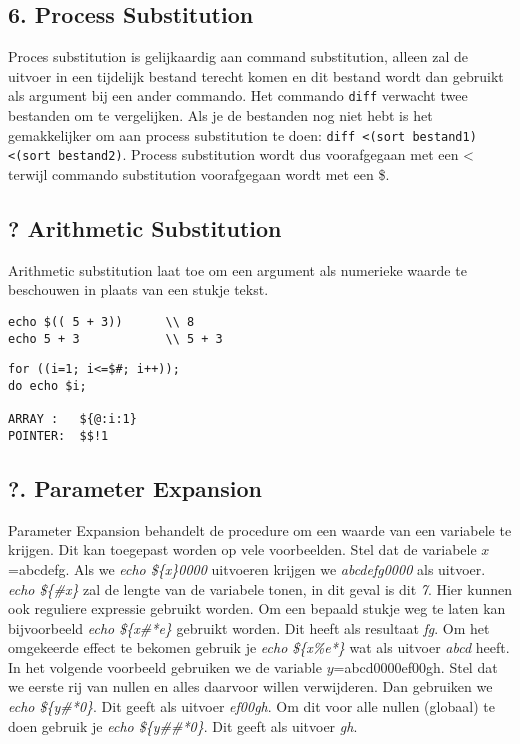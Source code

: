 \documentclass{report}
\begin{document}
\subsection{6. Process Substitution}
Proces substitution is gelijkaardig aan command substitution, alleen zal de uitvoer in een tijdelijk bestand terecht komen en dit bestand wordt dan gebruikt als argument bij een ander commando. Het commando \texttt{diff} verwacht twee bestanden om te vergelijken. Als je de bestanden nog niet hebt is het gemakkelijker om aan process substitution te doen: \texttt{diff <(sort bestand1) <(sort bestand2)}. Process substitution wordt dus voorafgegaan met een < terwijl commando substitution voorafgegaan wordt met een \$.
\subsection{? Arithmetic Substitution}
Arithmetic substitution laat toe om een argument als numerieke waarde te beschouwen in plaats van een stukje tekst. 
\begin{lstlisting}
echo $(( 5 + 3))      \\ 8
echo 5 + 3            \\ 5 + 3
\end{lstlisting}

\begin{lstlisting}
for ((i=1; i<=$#; i++)); 
do echo $i;

ARRAY :   ${@:i:1}
POINTER:  $$!1
\end{lstlisting}
\subsection{?. Parameter Expansion}
Parameter Expansion behandelt de procedure om een waarde van een variabele te krijgen. Dit kan toegepast worden op vele voorbeelden. Stel dat de variabele $x$=abcdefg. Als we \textit{echo \$\{x\}0000} uitvoeren krijgen we \textit{abcdefg0000} als uitvoer. \textit{echo \$\{\#x\}} zal de lengte van de variabele tonen, in dit geval is dit \textit{7}. Hier kunnen ook reguliere expressie gebruikt worden. Om een bepaald stukje weg te laten kan bijvoorbeeld \textit{echo \$\{x\#*e\}} gebruikt worden. Dit heeft als resultaat \textit{fg}. Om het omgekeerde effect te bekomen gebruik je \textit{echo \$\{x\%e*\}} wat als uitvoer \textit{abcd} heeft.
\newline
In het volgende voorbeeld gebruiken we de variable $y$=abcd0000ef00gh. Stel dat we eerste rij van nullen en alles daarvoor willen verwijderen. Dan gebruiken we \textit{echo \$\{y\#*0\}}. Dit geeft als uitvoer \textit{ef00gh}. Om dit voor alle nullen (globaal) te doen gebruik je \textit{echo \$\{y\#\#*0\}}. Dit geeft als uitvoer \textit{gh}.
\end{document}
